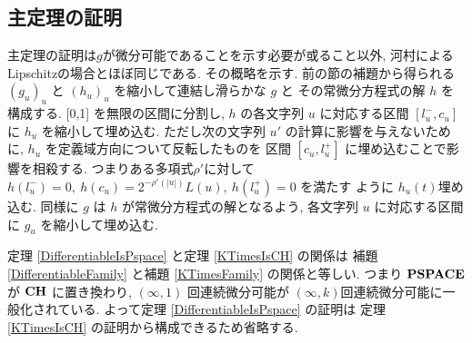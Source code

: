 \subsection{主定理の証明}
\label{subsection: proof of theorems}

 主定理の証明は$g$が微分可能であることを示す必要が或ること以外,
 河村によるLipschitzの場合とほぼ同じである\cite[定理3.2]{kawamura2010lipschitz}.
 その概略を示す.
 前の節の補題から得られる $(g_u)_u$ と $(h_u)_u$ を縮小して連結し滑らかな $g$ と
 その常微分方程式の解 $h$ を構成する.
 [0,1] を無限の区間に分割し, $h$ の各文字列 $u$ に対応する区間
 $[l^-_u, c_u]$ に $h_u$ を縮小して埋め込む. 
 ただし次の文字列 $u'$ の計算に影響を与えないために,
 $h_u$ を定義域方向について反転したものを
 区間 $[c_u, l^+_u]$ に埋め込むことで影響を相殺する.
 つまりある多項式$\rho'$に対して
 $h(l^-_u) = 0,\ h(c_u) = 2^{-\rho'(|u|)} L(u),\ h(l^+_u) = 0$ を満たす
 ように $h_u(t)$埋め込む.
 同様に $g$ は $h$ が常微分方程式の解となるよう,
 各文字列 $u$ に対応する区間に $g_u$ を縮小して埋め込む.

 定理 \ref{DifferentiableIsPspace} と定理 \ref{KTimesIsCH} の関係は
 補題 \ref{DifferentiableFamily} と補題 \ref{KTimesFamily} の関係と等しい.
 つまり $\mathbf{PSPACE}$ が $\mathbf{CH}$ に置き換わり,
 $(\infty, 1)$ 回連続微分可能が $(\infty, k)$回連続微分可能に一般化されている.
 よって定理 \ref{DifferentiableIsPspace} の証明は
 定理 \ref{KTimesIsCH} の証明から構成できるため省略する.

